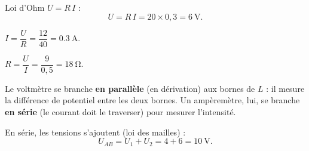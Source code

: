 \documentclass[11pt,a4paper]{article}
\begin{document}
\usetikzlibrary{babel}
\begin{corrige}
Loi d'Ohm $U=R\,I$ :
\[ U=R\,I=20\times0{,}3=\qty{6}{\volt}. \]
\end{corrige}

\begin{corrige}
$I=\dfrac{U}{R}=\dfrac{12}{40}=\qty{0.3}{\ampere}$.
\end{corrige}

\begin{corrige}
$R=\dfrac{U}{I}=\dfrac{9}{0{,}5}=\qty{18}{\ohm}$.
\end{corrige}

\begin{corrige}
Le voltmètre se branche \textbf{en parallèle} (en dérivation) aux bornes de $L$ : il mesure la
différence de potentiel entre les deux bornes. Un ampèremètre, lui, se branche \textbf{en série}
(le courant doit le traverser) pour mesurer l'intensité.
\end{corrige}

\begin{corrige}
En série, les tensions s'ajoutent (loi des mailles) :
\[ U_{AB}=U_1+U_2=4+6=\qty{10}{\volt}. \]
\end{corrige}
\end{document}
